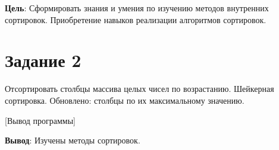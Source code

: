 \documentclass[variant=labwork]{bsuir}
\begin{document}
\maketitle

\textbf{Цель}: Сформировать знания и умения по изучению методов внутренних
сортировок. Приобретение навыков реализации алгоритмов сортировок.

\section*{Задание 2}

Отсортировать столбцы массива целых чисел по возрастанию. Шейкерная сортировка.
Обновлено: столбцы по их максимальному значению.


[Вывод программы]

\textbf{Вывод}: Изучены методы сортировок.
\end{document}
